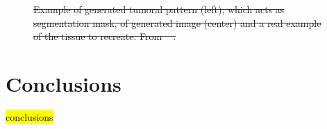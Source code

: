 \documentclass[12pt,a4paper]{report}
\providecommand{\DIFdeltex}[1]{{\protect\color{red}\sout{#1}}}                      %
\providecommand{\DIFdelFL}[1]{\DIFdel{#1}} %
\providecommand{\DIFdelendFL}{} %
\providecommand{\DIFdel}[1]{\texorpdfstring{\DIFdeltex{#1}}{}} %
\DeclareRobustCommand{\DIFdelendFL}{\DIFOaddendFL \let\includegraphics\DIFOincludegraphics} %
\begin{document}
\begin{figure}
{%
}
{%
}
{%
}
{%
\DIFdelFL{Example of generated tumoral pattern (left), which acts as segmentation mask, of generated image (center) and a real example of the tissue to recreate. From \mbox{%
\cite{Senaras2018}}\hspace{0pt}%
.}}
\DIFdelendFL \end{figure}

        \clearpage

    \chapter*{Conclusions}
\label{chap:concl}

\hl{conclusions}

    \clearpage

    
\end{document}

